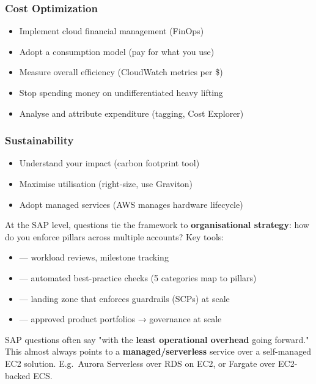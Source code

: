 \subsubsection{Cost Optimization}
\begin{itemize}
  \item Implement cloud financial management (FinOps)
  \item Adopt a consumption model (pay for what you use)
  \item Measure overall efficiency (CloudWatch metrics per \$)
  \item Stop spending money on undifferentiated heavy lifting
  \item Analyse and attribute expenditure (tagging, Cost Explorer)
\end{itemize}

\subsubsection{Sustainability}
\begin{itemize}
  \item Understand your impact (carbon footprint tool)
  \item Maximise utilisation (right-size, use Graviton)
  \item Adopt managed services (AWS manages hardware lifecycle)
\end{itemize}

\begin{sapdepth}
At the SAP level, questions tie the framework to \textbf{organisational strategy}:
how do you enforce pillars across multiple accounts? Key tools:
\begin{itemize}
  \item {} — workload reviews, milestone tracking
  \item {} — automated best-practice checks (5 categories map to pillars)
  \item {} — landing zone that enforces guardrails (SCPs) at scale
  \item {} — approved product portfolios → governance at scale
\end{itemize}
\end{sapdepth}

\begin{examtip}[title={\faLightbulb~SAP exam tip: "most operationally efficient"}]
SAP questions often say "with the \textbf{least operational overhead} going forward."
This almost always points to a \textbf{managed/serverless} service over a self-managed
EC2 solution. E.g.\ Aurora Serverless over RDS on EC2, or Fargate over EC2-backed ECS.
\end{examtip}
